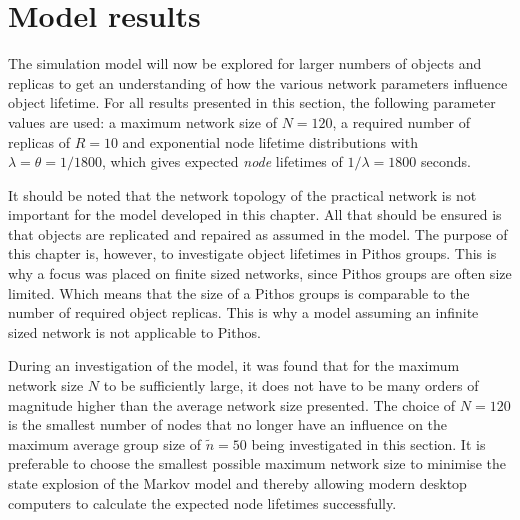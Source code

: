 \section{Model results}
\label{results}

The simulation model will now be explored for larger numbers of objects and replicas to get an understanding of how the various network parameters influence object lifetime. For all results presented in this section, the following parameter values are used: a maximum network size of $N=120$, a required number of replicas of $R = 10$ and exponential node lifetime distributions with $\lambda = \theta = 1/1800$, which gives expected \emph{node} lifetimes of $1/\lambda = 1800$ seconds.

It should be noted that the network topology of the practical network is not important for the model developed in this chapter. All that should be ensured is that objects are replicated and repaired as assumed in the model. The purpose of this chapter is, however, to investigate object lifetimes in Pithos groups. This is why a focus was placed on finite sized networks, since Pithos groups are often size limited. Which means that the size of a Pithos groups is comparable to the number of required object replicas. This is why a model assuming an infinite sized network is not applicable to Pithos.

During an investigation of the model, it was found that for the maximum network size $N$ to be sufficiently large, it does not have to be many orders of magnitude higher than the average network size presented. The choice of $N=120$ is the smallest number of nodes that no longer have an influence on the maximum average group size of $\tilde{n}=50$ being investigated in this section. It is preferable to choose the smallest possible maximum network size to minimise the state explosion of the Markov model and thereby allowing modern desktop computers to calculate the expected node lifetimes successfully.

